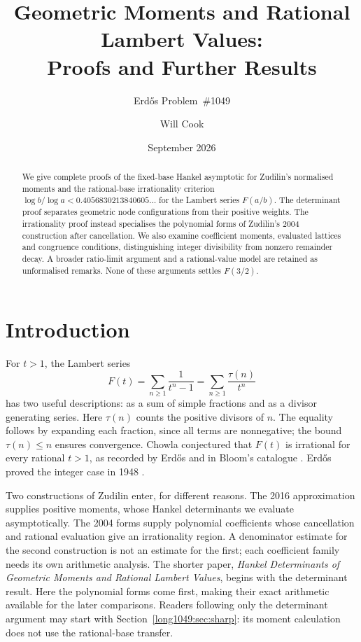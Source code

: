\documentclass[11pt]{article}
\title{Geometric Moments and Rational Lambert Values:\\Proofs and Further Results}
\subtitle{Erd\H{o}s Problem~\#1049}
\author{Will Cook}
\date{September 2026}
\begin{document}
\maketitle
\noteprovenance

\begin{abstract}
We give complete proofs of the fixed-base Hankel asymptotic for
Zudilin's normalised moments and the rational-base irrationality
criterion $\log b/\log a<0.4056830213840605\ldots$ for the Lambert
series $F(a/b)$. The determinant proof separates geometric node
configurations from their positive weights. The irrationality
proof instead specialises the polynomial forms of Zudilin's 2004
construction after cancellation. We also examine coefficient
moments, evaluated lattices and congruence conditions, distinguishing
integer divisibility from nonzero remainder decay. A broader
ratio-limit argument and a rational-value model are retained as
unformalised remarks. None of these arguments settles $F(3/2)$.
\end{abstract}

\section{Introduction}\label{long1049:sec:problem}

For $t>1$, the Lambert series
\[
 F(t)=\sum_{n\ge1}\frac1{t^n-1}
     =\sum_{n\ge1}\frac{\tau(n)}{t^n}
\]
has two useful descriptions: as a sum of simple fractions and as
a divisor generating series. Here $\tau(n)$ counts the positive
divisors of $n$. The equality follows by expanding each fraction,
since all terms are nonnegative; the bound $\tau(n)\le n$ ensures
convergence. Chowla conjectured that $F(t)$ is irrational for every
rational $t>1$, as recorded by Erd\H{o}s \cite[p.~102]{erdos1988}
and in Bloom's catalogue \cite{erdosproblems}. Erd\H{o}s proved the
integer case in 1948 \cite{erdos1948}.

Two constructions of Zudilin enter, for different reasons.
The 2016 approximation \cite{zudilin2016} supplies positive
moments, whose Hankel determinants we evaluate asymptotically.
The 2004 forms \cite{zudilin2004} supply polynomial coefficients
whose cancellation and rational evaluation give an irrationality
region. A denominator estimate for the second construction is not an
estimate for the first; each coefficient family needs its own
arithmetic analysis. The shorter paper,
\emph{Hankel Determinants of Geometric Moments and Rational Lambert
Values}, begins with the determinant result. Here the polynomial
forms come first, making their exact arithmetic available for the
later comparisons. Readers following only the determinant argument
may start with Section~\ref{long1049:sec:sharp}: its moment calculation
does not use the rational-base transfer.
\end{document}
